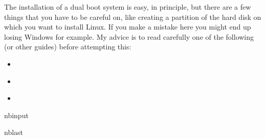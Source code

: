 \documentclass[letterpaper,10pt,english]{sphinxmanual}
\begin{document}
\sphinxAtStartPar
The installation of a dual boot system is easy, in principle, but there are a few things that you have to be careful on, like creating a partition of the hard disk on which you want to install Linux. If you make a mistake here you might end up losing Windows for example. My advice is to read carefully one of the following (or other guides) before attempting this:
\begin{itemize}
\item {} 
\sphinxAtStartPar
{}%
\begin{footnote}[20]\sphinxAtStartFootnote
{}
%
\end{footnote}

\item {} 
\sphinxAtStartPar
{}%
\begin{footnote}[21]\sphinxAtStartFootnote
{}
%
\end{footnote}

\item {} 
\sphinxAtStartPar
{}%
\begin{footnote}[22]\sphinxAtStartFootnote
{}
%
\end{footnote}

\end{itemize}

\begin{sphinxuseclass}{nbinput}
\begin{sphinxuseclass}{nblast}
{
\begin{sphinxVerbatim}[commandchars=\\\{\}]
\llap{\color{nbsphinxin}[ ]:\,\hspace{\fboxrule}\hspace{\fboxsep}}
\end{sphinxVerbatim}
}

\end{sphinxuseclass}
\end{sphinxuseclass}



\chapter{ }
\label{\detokenize{toc:space}}


\renewcommand{\indexname}{Index}
\printindex
\end{document}
